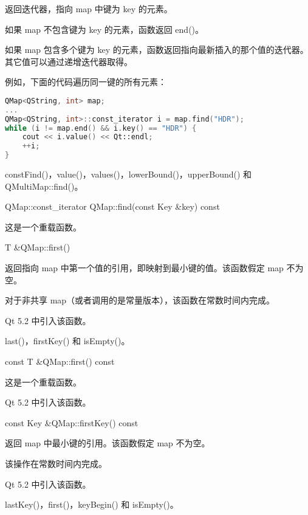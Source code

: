 返回迭代器，指向 map 中键为 key 的元素。

如果 map 不包含键为 key 的元素，函数返回 end()。

如果 map 包含多个键为 key 的元素，函数返回指向最新插入的那个值的迭代器。
其它值可以通过递增迭代器取得。

例如，下面的代码遍历同一键的所有元素：

\begin{lstlisting}[language=C++]
QMap<QString, int> map;
...
QMap<QString, int>::const_iterator i = map.find("HDR");
while (i != map.end() && i.key() == "HDR") {
    cout << i.value() << Qt::endl;
    ++i;
}
\end{lstlisting}


\begin{notice}[另请参阅]
constFind()，value()，values()，lowerBound()，upperBound() 和 QMultiMap::find()。
\end{notice}

\splitLine

QMap::const\_iterator QMap::find(const Key \&key) const

这是一个重载函数。

\splitLine

T \&QMap::first()

返回指向 map 中第一个值的引用，即映射到最小键的值。该函数假定 map 不为空。

对于非共享 map（或者调用的是常量版本），该函数在常数时间内完成。

Qt 5.2 中引入该函数。


\begin{notice}[另请参阅]
last()，firstKey() 和 isEmpty()。
\end{notice}

\splitLine

const T \&QMap::first() const

这是一个重载函数。

Qt 5.2 中引入该函数。

\splitLine

const Key \&QMap::firstKey() const

返回 map 中最小键的引用。该函数假定 map 不为空。

该操作在常数时间内完成。

Qt 5.2 中引入该函数。


\begin{notice}[另请参阅]
lastKey()，first()，keyBegin() 和 isEmpty()。
\end{notice}

